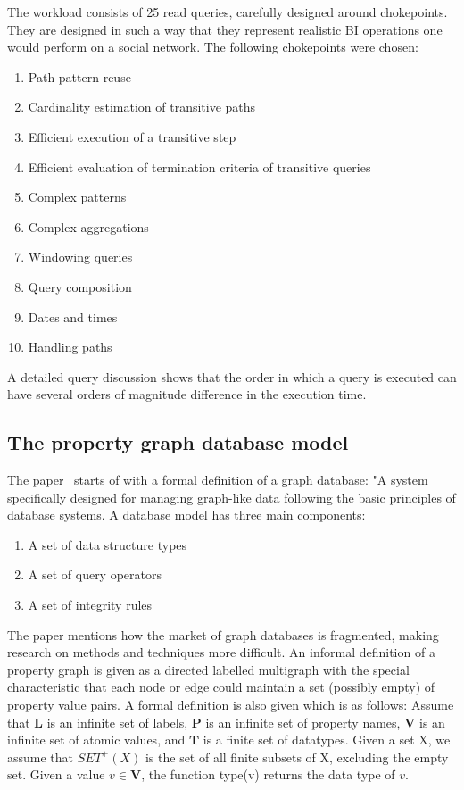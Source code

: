 The workload consists of 25 read queries, carefully designed around chokepoints. They are designed in such a way that they represent realistic BI operations one would perform on a social network. The following chokepoints were chosen: 
\begin{enumerate}
    \item Path pattern reuse
    \item Cardinality estimation of transitive paths
    \item Efficient execution of a transitive step
    \item Efficient evaluation of termination criteria of transitive queries
    \item Complex patterns
    \item Complex aggregations
    \item Windowing queries
    \item Query composition
    \item Dates and times
    \item Handling paths
\end{enumerate}

A detailed query discussion shows that the order in which a query is executed can have several orders of magnitude difference in the execution time.

\subsection{The property graph database model}
The paper~\cite{ctx13030483780005131} starts of with a formal definition of a graph database: "A system specifically designed for managing graph-like data following the basic principles of database systems. 
A database model has three main components: 
\begin{enumerate}
    \item A set of data structure types
    \item A set of query operators
    \item A set of integrity rules
\end{enumerate}

The paper mentions how the market of graph databases is fragmented, making research on methods and techniques more difficult. 
An informal definition of a property graph is given as a directed labelled multigraph with the special characteristic that each node or edge could maintain a set (possibly empty) of property value pairs. 
A formal definition is also given which is as follows: Assume that $\boldsymbol{L}$ is an infinite set of labels, $\boldsymbol{P}$ is an infinite set of property names, $\boldsymbol{V}$ is an infinite set of atomic values, and $\boldsymbol{T}$ is a finite set of datatypes. Given a set X, we assume that $SET^+(X)$ is the set of all finite subsets of X, excluding the empty set. Given a value $v \in \boldsymbol{V}$, the function type(v) returns the data type of $v$. 

